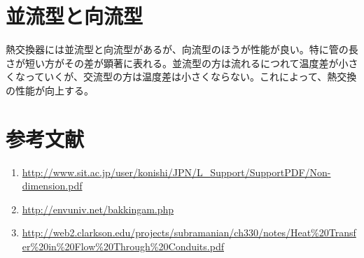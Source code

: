\documentclass[a4j,twoside,openright,11pt]{jarticle}
\begin{document}
\section{並流型と向流型}
熱交換器には並流型と向流型があるが、向流型のほうが性能が良い。特に管の長さが短い方がその差が顕著に表れる。並流型の方は流れるにつれて温度差が小さくなっていくが、交流型の方は温度差は小さくならない。これによって、熱交換の性能が向上する。

\section{参考文献}
\begin{enumerate}
\item \url{http://www.sit.ac.jp/user/konishi/JPN/L_Support/SupportPDF/Non-dimension.pdf}
\item \url{http://envuniv.net/bakkingam.php}
\item \url{http://web2.clarkson.edu/projects/subramanian/ch330/notes/Heat%20Transfer%20in%20Flow%20Through%20Conduits.pdf}
\end{enumerate}
\end{document}
